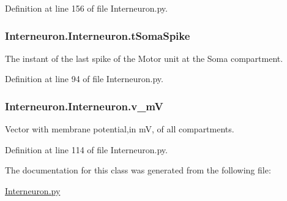 Definition at line 156 of file Interneuron.\+py.

\subsubsection[{\texorpdfstring{t\+Soma\+Spike}{tSomaSpike}}]{\setlength{\rightskip}{0pt plus 5cm}Interneuron.\+Interneuron.\+t\+Soma\+Spike}\hypertarget{class_interneuron_1_1_interneuron_a3fabf689dfda7199c84e44bbf216f90c}{}\label{class_interneuron_1_1_interneuron_a3fabf689dfda7199c84e44bbf216f90c}


The instant of the last spike of the Motor unit at the Soma compartment. 



Definition at line 94 of file Interneuron.\+py.

\subsubsection[{\texorpdfstring{v\+\_\+mV}{v_mV}}]{\setlength{\rightskip}{0pt plus 5cm}Interneuron.\+Interneuron.\+v\+\_\+mV}\hypertarget{class_interneuron_1_1_interneuron_a55cb57e83adad5560b6e6134ad868219}{}\label{class_interneuron_1_1_interneuron_a55cb57e83adad5560b6e6134ad868219}


Vector with membrane potential,in mV, of all compartments. 



Definition at line 114 of file Interneuron.\+py.



The documentation for this class was generated from the following file\+:\begin{DoxyCompactItemize}
\item 
\hyperlink{_interneuron_8py}{Interneuron.\+py}\end{DoxyCompactItemize}

